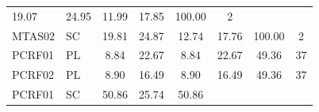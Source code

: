 \documentclass[11pt,a4paper]{article}
\begin{document}
\begin{table}[H]
\begin{tabular}{llcccccc}
    
        19.07
     &

    
        24.95
     &

    
        11.99
     &

    
        17.85
     &

    
        100.00
     &

    
        2
    
    \\

    MTAS02 &
    SC &

    
        19.81
     &

    
        24.87
     &

    
        12.74
     &

    
        17.76
     &

    
        100.00
     &

    
        2
    
    \\

    PCRF01 &
    PL &

    
        8.84
     &

    
        22.67
     &

    
        8.84
     &

    
        22.67
     &

    
        49.36
     &

    
        37
    
    \\

    PCRF02 &
    PL &

    
        8.90
     &

    
        16.49
     &

    
        8.90
     &

    
        16.49
     &

    
        49.36
     &

    
        37
    
    \\

    PCRF01 &
    SC &

    
        50.86
     &

    
        25.74
     &

    
        50.86
     &


\end{tabular}
\end{table}
\end{document}

